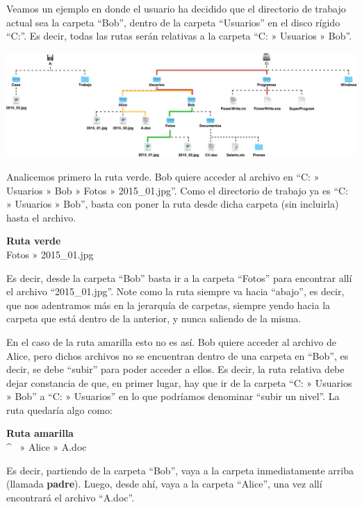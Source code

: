 Veamos un ejemplo en donde el usuario ha decidido que el directorio de trabajo
actual sea la carpeta ``Bob'', dentro de la carpeta ``Usuarios'' en el disco
rígido ``C:''. Es decir, todas las rutas serán relativas a la carpeta
``C: » Usuarios » Bob''.

\vspace{0.5cm}
\centerline{\includegraphics[scale=0.35]{capitulos/informatica/imagenes/directorios_windows_3.png}}

Analicemos primero la ruta verde. Bob quiere acceder al archivo en ``C: » Usuarios
» Bob » Fotos » 2015\_01.jpg''. Como el directorio de trabajo ya es ``C: » Usuarios » Bob'',
basta con poner la ruta desde dicha carpeta (sin incluirla) hasta el archivo.

\begin{example}
    \textbf{Ruta verde}\\
    Fotos » 2015\_01.jpg
\end{example}

Es decir, desde la carpeta ``Bob'' basta ir a la carpeta ``Fotos'' para encontrar
allí el archivo ``2015\_01.jpg''. Note como la ruta siempre va hacia ``abajo'',
es decir, que nos adentramos más en la jerarquía de carpetas, siempre yendo hacia
la carpeta que está dentro de la anterior, y nunca saliendo de la misma.

En el caso de la ruta amarilla esto no es así. Bob quiere acceder al archivo de Alice,
pero dichos archivos no se encuentran dentro de una carpeta en ``Bob'', es decir,
se debe ``subir'' para poder acceder a ellos. Es decir, la ruta relativa debe
dejar constancia de que, en primer lugar, hay que ir de la carpeta ``C: » Usuarios
» Bob'' a ``C: » Usuarios'' en lo que podríamos denominar ``subir un nivel''. La
ruta quedaría algo como:

\begin{example}
    \textbf{Ruta amarilla}\\
    \textasciicircum ~ » Alice » A.doc
\end{example}

Es decir, partiendo de la carpeta ``Bob'', vaya a la carpeta inmediatamente
arriba (llamada \textbf{padre}). Luego, desde ahí, vaya a la carpeta ``Alice'',
una vez allí encontrará el archivo ``A.doc''.

